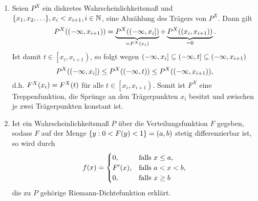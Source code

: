 \documentclass{lecture}
\begin{document}
\begin{remark}
\begin{enumerate}
            Aus \(P\parentheses*{X = x} = 0\) folgt zunächst die linksseitige Stetigkeit von \(F^X\) an der Stelle \(x\).
            Da \(F^X\) als Verteilungsfunktion ohnehin rechtsseitig stetig ist, folgt dann auch die Stetigkeit von \(F^X\) an der Stelle \(x\).
            Gilt daher \(P\parentheses*{X = x} = 0\), so folgt insbesondere die für stetige Verteilungsfunktionen stets erfüllte Beziehung
            \[
                P\parentheses*{x \le X} = 1 - F^X\parentheses*{x}.
            \]
            Weiterhin gilt, dass es höchstens abzählbar viele Punkte \(x \in \R\) mit \(P\parentheses*{X = x} > 0\) gibt, d.h. es gibt höchstens abzählbar viele Unstetigkeitsstellen der Vertelungsfunktion.
            \item Seien \(P^X\) ein diskretes Wahrscheinlichkeitsmaß und \(\braces*{x_1, x_2, \ldots} , x_i < x_{i + 1}, i \in \N\), eine Abzählung des Trägers von \(P^X\).
            Dann gilt
            \[
                P^X\parentheses*{\parentheses*{-\infty, x_{i + 1}}} = \underbrace{P^X\parentheses*{\left(-\infty, x_i\right]}}_{= F^X\parentheses*{x_i}} + \underbrace{P^X\parentheses*{\parentheses*{x_i, x_{i + 1}}}}_{= 0}.
            \]
            Ist damit \(t \in \left[x_i, x_{i + 1}\right)\), so folgt wegen \(\left(-\infty, x_i\right] \subseteq \left(-\infty, t\right] \subseteq \parentheses*{-\infty, x_{i + 1}}\)
            \[
                P^X\parentheses*{\left(-\infty, x_i\right]} \le P^X\parentheses*{\parentheses*{-\infty, t}} \le P^X\parentheses*{\parentheses*{-\infty, x_{i + 1}}},
            \]
            d.h. \(F^X\parentheses*{x_i} = F^X\parentheses*{t}\) für alle \(t \in \left[x_i, x_{i + 1}\right)\).
            Somit ist \(F^X\) eine Treppenfunktion, die Sprünge an den Trägerpunkten \(x_i\) besitzt und zwischen je zwei Trägerpunkten konstant ist.
            \item Ist ein Wahrscheinlichkeitsmaß \(P\) über die Verteilungsfunktion \(F\) gegeben, sodass \(F\) auf der Menge \(\braces*{y : 0 < F\parentheses*{y} < 1} = \parentheses*{a, b}\) stetig differenzierbar ist, so wird durch
            \[
                f\parentheses*{x} = \begin{cases}
                    0, & \text{falls }x \le a,\\
                    F'\parentheses*{x}, & \text{falls }a < x < b,\\
                    0, & \text{falls }x \ge b
                \end{cases}
            \]
            die zu \(P\) gehörige Riemann-Dichtefunktion erklärt.
        \end{enumerate}
    \end{remark}
\end{document}
